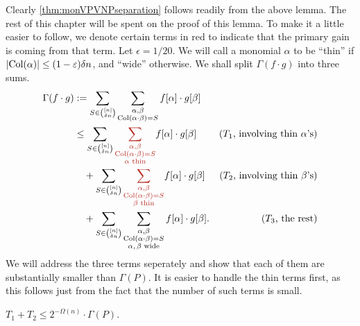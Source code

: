 Clearly \autoref{thm:monVPVNPseparation} follows readily from the above lemma.
The rest of this chapter will be spent on the proof of this lemma. To make it a little easier to follow, we denote certain terms in \textcolor{BrickRed}{red} to indicate that the primary gain is coming from that term.
Let $\epsilon = 1/20$. We will call a monomial $\alpha$ to be ``thin'' if $\left|\operatorname{Col}(\alpha)\right| \leq (1-\varepsilon) \delta n$, and ``wide'' otherwise. 
We shall split $\Gamma(f \cdot g)$ into three sums.
\begin{align*}
  \Gamma(f \cdot g) & :=   \sum_{S \in \binom{[n]}{\delta n}} \sum_{\substack{\alpha, \beta\\ \Col(\alpha \cdot \beta) = S}} f[\alpha] \cdot g[\beta]\\
                    & \leq \sum_{S \in \binom{[n]}{\delta n}} \textcolor{BrickRed}{\sum_{\substack{\alpha, \beta\\ \Col(\alpha \cdot \beta) = S \\ \text{$\alpha$ thin}}}} f[\alpha] \cdot g[\beta] & \text{($T_1$, involving thin $\alpha$'s)}\\
                    & \quad + \sum_{S \in \binom{[n]}{\delta n}} \textcolor{BrickRed}{\sum_{\substack{\alpha, \beta\\ \Col(\alpha \cdot \beta) = S \\ \text{$\beta$ thin}}}} f[\alpha] \cdot g[\beta] & \text{($T_2$, involving thin $\beta$'s)}\\
                    & \quad + \sum_{S \in \binom{[n]}{\delta n}} \sum_{\substack{\alpha, \beta\\ \Col(\alpha \cdot \beta) = S \\ \text{$\alpha,\beta$ wide}}} f[\alpha] \cdot g[\beta]. & \text{($T_3$, the rest)}                                                           
\end{align*}
We will address the three terms seperately and show that each of them are substantially smaller than $\Gamma(P)$.
It is easier to handle the thin terms first, as this follows just from the fact that the number of such terms is small.
\begin{claim}
  $T_1 + T_2 \leq 2^{-\Omega(n)} \cdot \Gamma(P)$. 
\end{claim}
